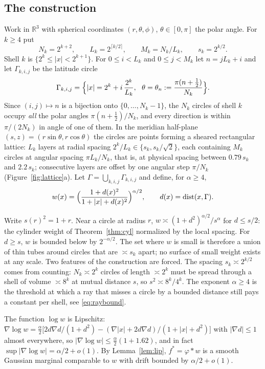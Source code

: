 \documentclass[11pt]{amsart}
\newcommand{\R}{\mathbb{R}}
\newcommand{\abs}[1]{\lvert #1\rvert}
\DeclareMathOperator{\dist}{dist}
\theoremstyle{plain}
\theoremstyle{definition}
\theoremstyle{remark}
\begin{document}
\subsection{The construction}\label{sec:construction}
Work in $\R^3$ with spherical coordinates $(r,\theta,\phi)$, $\theta\in[0,\pi]$
the polar angle. For $k\ge4$ put
\[
N_k=2^{k+2},\qquad L_k=2^{\lceil k/2\rceil},\qquad M_k=N_k/L_k,\qquad
s_k=2^{k/2}.
\]
Shell $k$ is $\{2^k\le\abs x<2^{k+1}\}$. For $0\le i<L_k$ and $0\le j<M_k$ let
$n=jL_k+i$ and let $\Gamma_{k,i,j}$ be the latitude circle
\[
\Gamma_{k,i,j}=\Bigl\{\abs x=2^k+i\,\frac{2^k}{L_k},\ \ \theta=\theta_n:=
\frac{\pi(n+\tfrac12)}{N_k}\Bigr\}.
\]
Since $(i,j)\mapsto n$ is a bijection onto $\{0,\dots,N_k-1\}$, the $N_k$
circles of shell $k$ occupy \emph{all} the polar angles $\pi(n+\frac12)/N_k$,
and every direction is within $\pi/(2N_k)$ in angle of one of them. In the
meridian half-plane $(s,z)=(r\sin\theta,r\cos\theta)$ the circles are points
forming a sheared rectangular lattice: $L_k$ layers at radial spacing
$2^k/L_k\in\{s_k,s_k/\sqrt2\}$, each containing $M_k$ circles at angular
spacing $\pi L_k/N_k$, that is, at physical spacing between $0.79\,s_k$ and
$2.2\,s_k$; consecutive layers are offset by one angular step $\pi/N_k$
(Figure~\ref{fig:lattice}a). Let $\Gamma=\bigcup_{k,i,j}\Gamma_{k,i,j}$ and
define, for $\alpha\ge4$,
\begin{equation}\label{eq:w}
w(x)=\Bigl(\frac{1+d(x)^2}{1+\abs x+d(x)^2}\Bigr)^{\alpha/2},\qquad
d(x)=\dist(x,\Gamma).
\end{equation}

Write $s(r)^2=1+r$. Near a circle at radius $r$, $w\asymp(1+d^2)^{\alpha/2}/s^\alpha$
for $d\le s/2$: the cylinder weight of Theorem~\ref{thm:cyl} normalized by the
local spacing. For $d\ge s$, $w$ is bounded below by $2^{-\alpha/2}$. The set
where $w$ is small is therefore a union of thin tubes around circles that are
$\asymp s_k$ apart; no surface of small weight exists at any scale. Two
features of the construction are forced. The spacing $s_k\asymp2^{k/2}$ comes
from counting: $N_k\asymp2^k$ circles of length $\asymp2^k$ must be spread
through a shell of volume $\asymp8^k$ at mutual distance $s$, so
$s^2\asymp8^k/4^k$. The exponent $\alpha\ge4$ is the threshold at which a ray
that misses a circle by a bounded distance still pays a constant per shell, see
\eqref{eq:raybound}.

The function $\log w$ is Lipschitz: $\nabla\log w=\frac{\alpha}{2}\bigl[
2d\nabla d/(1+d^2)-(\nabla\abs x+2d\nabla d)/(1+\abs x+d^2)\bigr]$ with
$\abs{\nabla d}\le1$ almost everywhere, so $\abs{\nabla\log w}\le
\frac{\alpha}{2}(1+1.62)$, and in fact $\sup\abs{\nabla\log w}=\alpha/2+o(1)$.
By Lemma~\ref{lem:lip}, $f^*=\varphi*w$ is a smooth Gaussian marginal comparable
to $w$ with drift bounded by $\alpha/2+o(1)$.
\end{document}
